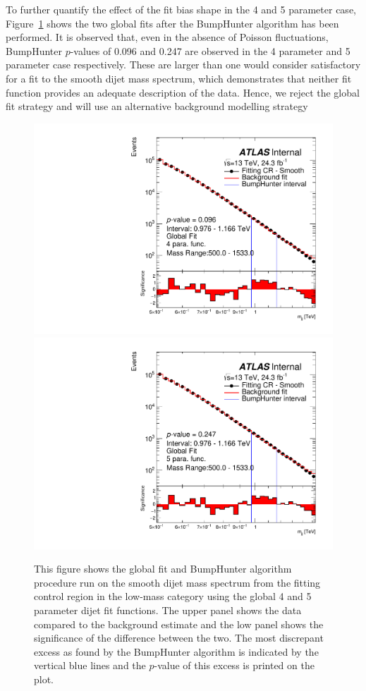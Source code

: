 To further quantify the effect of the fit bias shape in the 4 and 5 parameter case,
Figure~\ref{fig:bhFit_lm_global} shows the two global fits after the {\sc BumpHunter} algorithm has been performed.
It is observed that, even in the absence of Poisson fluctuations,
{\sc BumpHunter} $p$-values of 0.096 and 0.247 are observed in the 4 parameter and 5 parameter case respectively.
These are larger than one would consider satisfactory for a fit to the smooth dijet mass spectrum,
which demonstrates that neither fit function provides an adequate description of the data.
Hence, we reject the global fit strategy and will use an alternative background modelling strategy

\begin{figure}[!htb]
\captionsetup[subfigure]{aboveskip=0pt,justification=centering}
\centering
{} {
  \includegraphics[width=0.45\linewidth, angle=0]{figs/Dibjet/LowMass/FitStudy/globalFit_lm_bH_4para.pdf}
}
 {
  \includegraphics[width=0.45\linewidth, angle=0]{figs/Dibjet/LowMass/FitStudy/globalFit_lm_bH_5para.pdf}
}
\vspace{10pt}
\caption{\label{fig:bhFit_lm_global}
  This figure shows the global fit and {\sc BumpHunter} algorithm procedure run on the smooth dijet mass spectrum from the fitting control region in the low-mass category
  using the global 4 and 5 parameter dijet fit functions.
  The upper panel shows the data compared to the background estimate and the low panel shows the significance of the difference between the two.
  The most discrepant excess as found by the {\sc BumpHunter} algorithm is indicated by the vertical blue lines and the $p$-value of this excess is printed on the plot. }
\end{figure}

